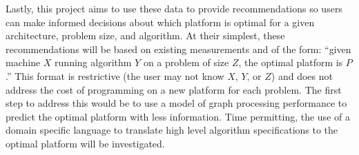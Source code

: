 \documentclass[11pt]{article}
\begin{document}
Lastly, this project aims to use these data to provide recommendations so users can make informed decisions about which platform is optimal for a given architecture, problem size, and algorithm. At their simplest, these recommendations will be based on existing measurements and of the form: ``given machine $X$ running algorithm $Y$ on a problem of size $Z$, the optimal platform is $P$.'' This format is restrictive (the user may not know $X$, $Y$, or $Z$) and does not address the cost of programming on a new platform for each problem. The first step to address this would be to use a model of graph processing performance to predict the optimal platform with less information. Time permitting, the use of a domain specific language to translate high level algorithm specifications to the optimal platform will be investigated.
\end{document}
